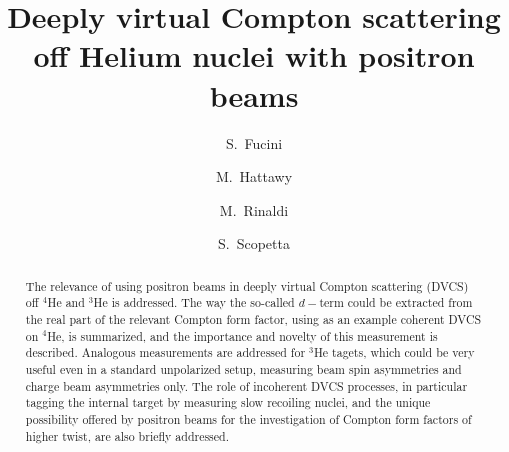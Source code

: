 \documentclass[times, twoside]{PosWhiPap}
\begin{document}
\title{Deeply virtual Compton scattering off Helium nuclei with positron beams}

\author[1]{S.~Fucini}
\author[2]{M.~Hattawy}
\author[1]{M.~Rinaldi}
\author[1]{S.~Scopetta}





\maketitle

\begin{abstract}
The relevance of using positron beams in deeply virtual Compton scattering (DVCS) off $^4$He and $^3$He 
   is addressed. The way the so-called $d-$term could be extracted from the 
   real part of the relevant Compton form factor, using as an example coherent 
   DVCS on $^4$He, is summarized, and the importance and novelty of this measurement is described. Analogous measurements are addressed for $^3$He tagets,
   which could be very useful even in a standard unpolarized setup, measuring beam spin asymmetries and charge beam asymmetries only.
   The role of incoherent  
   DVCS processes, in particular tagging the internal target by measuring slow recoiling nuclei,  and the unique possibility offered by positron beams for the 
   investigation of Compton form factors of higher twist, are also  briefly 
   addressed.
\end {abstract}


\end{document}

